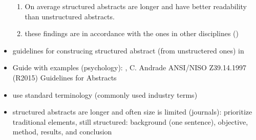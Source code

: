 \begin{itemize}
\begin{enumerate}
	\item On average structured abstracts are longer and have better readability than unstructured abstracts. \cite{KBO2008}
	\item these findings are in accordance with the ones in other disciplines ()
	\end{enumerate}
\item guidelines for construcing structured abstract (from unstructered ones) in \cite{KBO2008}
\item Guide with examples (psychology): , C. Andrade
	\newline
	ANSI/NISO Z39.14.1997 (R2015) Guidelines for Abstracts
\item use standard terminology (commonly used industry terms) \cite{Jedlitschka2008}
\item structured abstracts are longer and often size is limited (journals): prioritize traditional elements, still structured: background (one sentence), objective, method, results, and conclusion \cite{Jedlitschka2008}
\end{itemize}